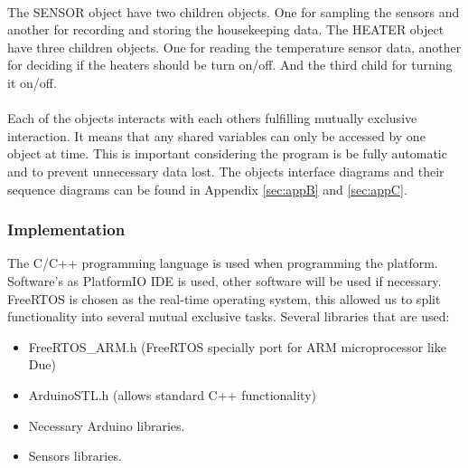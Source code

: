 \begin{enumerate}[label=(\alph*)]
\\
The SENSOR object have two children objects. One for sampling the sensors and another for recording and storing the housekeeping data. The HEATER object have three children objects. One for reading the temperature sensor data, another for deciding if the heaters should be turn on/off. And the third child for turning it on/off.\\ 
\\
Each of the objects interacts with each others fulfilling mutually exclusive interaction. It means that any shared variables can only be accessed by one object at time. This is important considering the program is be fully automatic and to prevent unnecessary data lost. The objects interface diagrams and their sequence diagrams can be found in Appendix \ref{sec:appB} and \ref{sec:appC}.
\end{enumerate}
\subsubsection{Implementation}
The C/C++ programming language is used when programming the platform. Software's as PlatformIO IDE is used, other software will be used if necessary. FreeRTOS is chosen as the real-time operating system, this allowed us to split functionality into several mutual exclusive tasks. Several libraries that are used:
\begin{itemize}
    \item FreeRTOS\_ARM.h (FreeRTOS specially port for ARM microprocessor like Due)
    \item ArduinoSTL.h (allows standard C++ functionality)
    \item Necessary Arduino libraries.
    \item Sensors libraries.
\end{itemize}


\raggedbottom